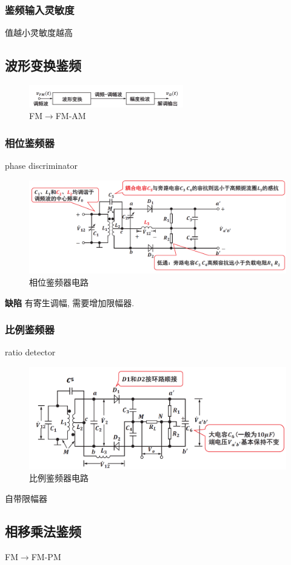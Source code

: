 \documentclass[a4paper]{report}
\begin{document}
\subsubsection{鉴频输入灵敏度}
值越小灵敏度越高
\subsection{波形变换鉴频}
\begin{figure}[H]
\centering
\includegraphics[width=0.6\textwidth]{fm_fm_am.png}
\caption{FM$\rightarrow$FM-AM}
\end{figure}
\subsubsection{相位鉴频器}
phase discriminator
\begin{figure}[H]
\centering
\includegraphics[width=1\textwidth]{fm_phase_discr.png}
\caption{相位鉴频器电路}
\end{figure}
\textbf{缺陷} 有寄生调幅, 需要增加限幅器. 
\subsubsection{比例鉴频器}
ratio detector
\begin{figure}[H]
\centering
\includegraphics[width=1\textwidth]{fm_ratio_dector.png}
\caption{比例鉴频器电路}
\end{figure}
自带限幅器
\subsection{相移乘法鉴频}
FM$\rightarrow$FM-PM
\end{document}
